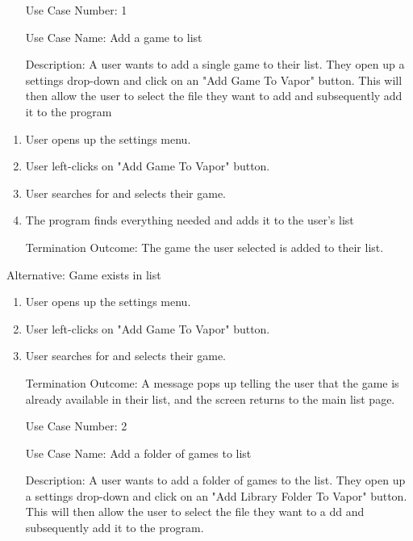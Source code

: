 \documentclass[10pt,conference,onecolumn,compsoc]{IEEEtran}
\begin{document}
\begin{itemize}
\item[Use Case Number:] 1
\item[Use Case Name:] Add a game to list
\item[Description:] A user wants to add a single game to their list. They open up a settings drop-down and click on an "Add Game To Vapor" button. This will then allow the user to select the file they want to add and subsequently add it to the program
\end{itemize}
%
%
\begin{enumerate}
\item User opens up the settings menu.
\item User left-clicks on "Add Game To Vapor" button.
\item User searches for and selects their game.
\item The program finds everything needed and adds it to the user's list
\item[Termination Outcome:] The game the user selected is added to their list.
\end{enumerate}
%
%
Alternative: Game exists in list
\begin{enumerate}
\item User opens up the settings menu.
\item User left-clicks on "Add Game To Vapor" button.
\item User searches for and selects their game.
\item [Termination Outcome:] A message pops up telling the user that the game is already available in their list, and the screen returns to the main list page.
\end{enumerate}
%
%
%
\begin{itemize}
\item[Use Case Number:] 2
\item[Use Case Name:] Add a folder of games to list
\item[Description:] A user wants to add a folder of games to the list. They open up a settings drop-down and click on an "Add Library Folder To Vapor" button. This will then allow the user to select the file they want to a dd and subsequently add it to the program.
\end{itemize}
\end{document}
